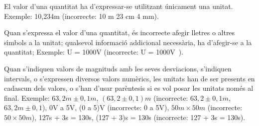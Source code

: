El valor d'una quantitat ha d'expressar-se  utilitzant \'{u}nicament una
unitat. Exemple: 10,234\unit{m} (incorrecte: 10 m 23 cm 4 mm).

Quan s'expressa el valor d'una quantitat, \'{e}s incorrecte afegir
lletres o altres s\'{\i}mbols a la unitat; qualsevol informaci\'{o}
addicional necess\`{a}ria, ha d'afegir-se a la quantitat; Exemple:
U = 1000\unit{V} (incorrecte: U = 1000\unit{V}).

Quan s'indiquen valors de magnituds amb les seves desviacions,
s'indiquen intervals, o s'expressen diversos valors num\`{e}rics, les
unitats han de ser presents en cadascun dels valors, o s'han d'usar
par\`{e}ntesis si es vol posar les unitats nom\'{e}s al final. Exemple:
$63{,}2\unit{m} \pm 0{,}1\unit{m}$, $(63{,}2 \pm 0{,}1)\unit{m}$
(incorrecte: $63{,}2 \pm 0{,}1\unit{m}$, $63{,}2\unit{m} \pm
0{,}1$), 0\unit{V} a 5\unit{V}, (0 a 5)\unit{V} (incorrecte: 0 a
5\unit{V}), $50\unit{m}\times 50\unit{m}$ (incorrecte: $50\times
50\unit{m}$), 127\unit{s} + 3\unit{s} = 130\unit{s}, (127 +
3)\unit{s} = 130\unit{s} (incorrecte: 127 + 3\unit{s} =
130\unit{s}).
